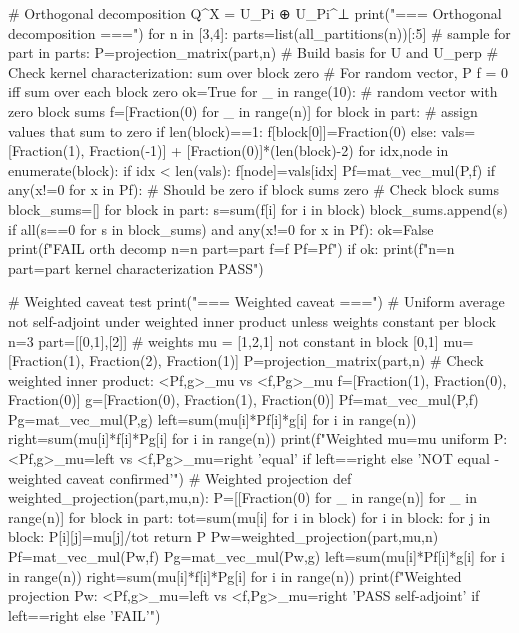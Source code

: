 # Orthogonal decomposition Q^X = U_Pi ⊕ U_Pi^⊥
print("\n=== Orthogonal decomposition ===")
for n in [3,4]:
    parts=list(all_partitions(n))[:5] # sample
    for part in parts:
        P=projection_matrix(part,n)
        # Build basis for U and U_perp
        # Check kernel characterization: sum over block zero
        # For random vector, P f = 0 iff sum over each block zero
        ok=True
        for _ in range(10):
            # random vector with zero block sums
            f=[Fraction(0) for _ in range(n)]
            for block in part:
                # assign values that sum to zero
                if len(block)==1:
                    f[block[0]]=Fraction(0)
                else:
                    vals=[Fraction(1), Fraction(-1)] + [Fraction(0)]*(len(block)-2)
                    for idx,node in enumerate(block):
                        if idx < len(vals):
                            f[node]=vals[idx]
            Pf=mat_vec_mul(P,f)
            if any(x!=0 for x in Pf):
                # Should be zero if block sums zero
                # Check block sums
                block_sums=[]
                for block in part:
                    s=sum(f[i] for i in block)
                    block_sums.append(s)
                if all(s==0 for s in block_sums) and any(x!=0 for x in Pf):
                    ok=False
                    print(f"FAIL orth decomp n={n} part={part} f={f} Pf={Pf}")
        if ok:
            print(f"n={n} part={part} kernel characterization PASS")

# Weighted caveat test
print("\n=== Weighted caveat ===")
# Uniform average not self-adjoint under weighted inner product unless weights constant per block
n=3
part=[[0,1],[2]]
# weights mu = [1,2,1] not constant in block [0,1]
mu=[Fraction(1), Fraction(2), Fraction(1)]
P=projection_matrix(part,n)
# Check weighted inner product: <Pf,g>_mu vs <f,Pg>_mu
f=[Fraction(1), Fraction(0), Fraction(0)]
g=[Fraction(0), Fraction(1), Fraction(0)]
Pf=mat_vec_mul(P,f)
Pg=mat_vec_mul(P,g)
left=sum(mu[i]*Pf[i]*g[i] for i in range(n))
right=sum(mu[i]*f[i]*Pg[i] for i in range(n))
print(f"Weighted mu={mu} uniform P: <Pf,g>_mu={left} vs <f,Pg>_mu={right} {'equal' if left==right else 'NOT equal - weighted caveat confirmed'}")
# Weighted projection
def weighted_projection(part,mu,n):
    P=[[Fraction(0) for _ in range(n)] for _ in range(n)]
    for block in part:
        tot=sum(mu[i] for i in block)
        for i in block:
            for j in block:
                P[i][j]=mu[j]/tot
    return P
Pw=weighted_projection(part,mu,n)
Pf=mat_vec_mul(Pw,f)
Pg=mat_vec_mul(Pw,g)
left=sum(mu[i]*Pf[i]*g[i] for i in range(n))
right=sum(mu[i]*f[i]*Pg[i] for i in range(n))
print(f"Weighted projection Pw: <Pf,g>_mu={left} vs <f,Pg>_mu={right} {'PASS self-adjoint' if left==right else 'FAIL'}")

